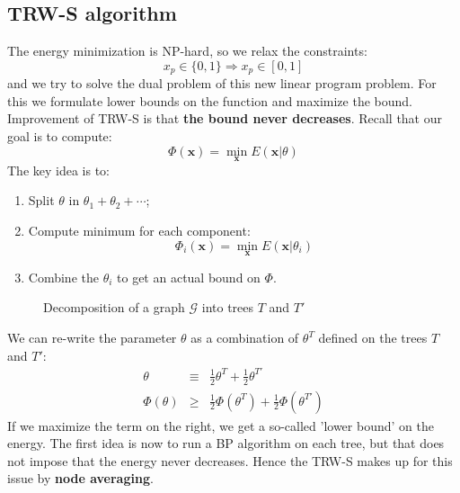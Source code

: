 \documentclass[10pt,a4paper]{article}
\begin{document}
\subsection{TRW-S algorithm}

The energy minimization is NP-hard, so we relax the constraints: 
\begin{equation}
x_p\in\{0,1\} \Rightarrow x_p\in[0,1]
\label{eq:}
\end{equation}
and we try to solve the dual problem of this new linear program problem. For this we formulate lower bounds on the function and maximize the bound. Improvement of TRW-S is that \textbf{the bound never decreases}. Recall that our goal is to compute:
\begin{equation}
\Phi(\mathbf{x}) = \min_{\mathbf{x}} E(\mathbf{x}|\theta)
\label{eq:}
\end{equation}
The key idea is to:
\begin{enumerate}
	\item Split $\theta$ in $\theta_1 + \theta_2 + \cdots$;
	\item Compute minimum for each component: 
	\begin{equation}
	\Phi_i(\mathbf{x}) = \min_{\mathbf{x}} E(\mathbf{x}|\theta_i)
	\label{eq:}
	\end{equation}
	\item Combine the $\theta_i$ to get an actual bound on $\Phi$.
\end{enumerate}

\begin{figure}[h!]
\centering
{}
\caption{Decomposition of a graph $\mathcal{G}$ into trees $T$ and $T'$}
\label{fig1}
\end{figure}
We can re-write the parameter $\theta$ as a combination of $\theta^T$ defined on the trees $T$ and $T'$:
\begin{equation}
\begin{array}{rll}
	\theta & \equiv & \displaystyle \frac{1}{2} \theta^T + \frac{1}{2} \theta^{T'} \\
	\Phi(\theta) & \geq & \displaystyle \frac{1}{2} \Phi(\theta^T) + \frac{1}{2} \Phi(\theta^{T'}) 
\end{array}
\label{eq:}
\end{equation}
If we maximize the term on the right, we get a so-called 'lower bound' on the energy. The first idea is now to run a BP algorithm on each tree, but that does not impose that the energy never decreases. Hence the TRW-S makes up for this issue by \textbf{node averaging}. 
\end{document}
